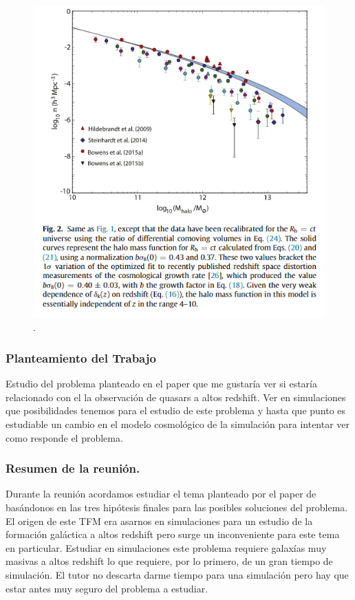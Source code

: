 \begin{figure}
\begin{center}
\includegraphics[scale=0.9]{Figuras/Melia}
\caption{\label{fig:melia} .}
\end{center}
\end{figure}

\subsubsection*{Planteamiento del Trabajo}

Estudio del problema planteado en el paper \cite{steinhardt2016impossibly} que me gustaría ver si estaría relacionado con el la observación de quasars a altos redshift. Ver en simulaciones que posibilidades tenemos para el estudio de este problema y hasta que punto es estudiable un cambio en el modelo cosmológico de la simulación para intentar ver como responde el problema.

\subsubsection*{Resumen de la reunión.}

Durante la reunión acordamos estudiar el tema planteado por el paper de \cite{steinhardt2016impossibly} basándonos en las tres hipótesis finales para las posibles soluciones del problema. El origen de este TFM era asarnos en simulaciones para un estudio de la formación galáctica a altos redshift pero surge un inconveniente para este tema en particular. Estudiar en simulaciones este problema requiere galaxías muy masivas a altos redshift lo que requiere, por lo primero, de un gran tiempo de simulación. El tutor no descarta darme tiempo para una simulación pero hay que estar antes muy seguro del problema a estudiar.\\

